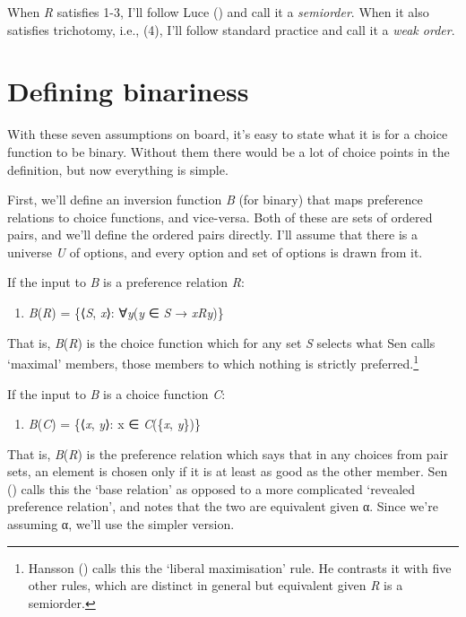 \documentclass[
  11pt,
  letterpaper,
  DIV=11,
  numbers=noendperiod,
  twoside]{scrartcl}
\providecommand{\tightlist}{%
  \setlength{\itemsep}{0pt}\setlength{\parskip}{0pt}}
\begin{document}
When \emph{R} satisfies 1-3, I'll follow Luce
() and call it a \emph{semiorder}. When it
also satisfies trichotomy, i.e., (4), I'll follow standard practice and
call it a \emph{weak order}.

\section{Defining binariness}\label{sec-defining}

With these seven assumptions on board, it's easy to state what it is for
a choice function to be binary. Without them there would be a lot of
choice points in the definition, but now everything is simple.

First, we'll define an inversion function \emph{B} (for binary) that
maps preference relations to choice functions, and vice-versa. Both of
these are sets of ordered pairs, and we'll define the ordered pairs
directly. I'll assume that there is a universe \emph{U} of options, and
every option and set of options is drawn from it.

If the input to \emph{B} is a preference relation \emph{R}:

\begin{enumerate}
\def\labelenumi{(\arabic{enumi})}
\setcounter{enumi}{6}
\tightlist
\item
  \emph{B}(\emph{R}) = \{⟨\emph{S}, \emph{x}⟩: ∀\emph{y}(\emph{y} ∈
  \emph{S} → \emph{xRy})\}
\end{enumerate}

That is, \emph{B}(\emph{R}) is the choice function which for any set
\emph{S} selects what Sen calls `maximal' members, those members to
which nothing is strictly preferred.\footnote{Hansson
  () calls this the `liberal
  maximisation' rule. He contrasts it with five other rules, which are
  distinct in general but equivalent given \emph{R} is a semiorder.}

If the input to \emph{B} is a choice function \emph{C}:

\begin{enumerate}
\def\labelenumi{(\arabic{enumi})}
\setcounter{enumi}{7}
\tightlist
\item
  \emph{B}(\emph{C}) = \{⟨\emph{x}, \emph{y}⟩: x ∈ \emph{C}(\{\emph{x},
  \emph{y}\})\}
\end{enumerate}

That is, \emph{B}(\emph{R}) is the preference relation which says that
in any choices from pair sets, an element is chosen only if it is at
least as good as the other member. Sen
() calls this the `base
relation' as opposed to a more complicated `revealed preference
relation', and notes that the two are equivalent given α. Since we're
assuming α, we'll use the simpler version.
\end{document}
